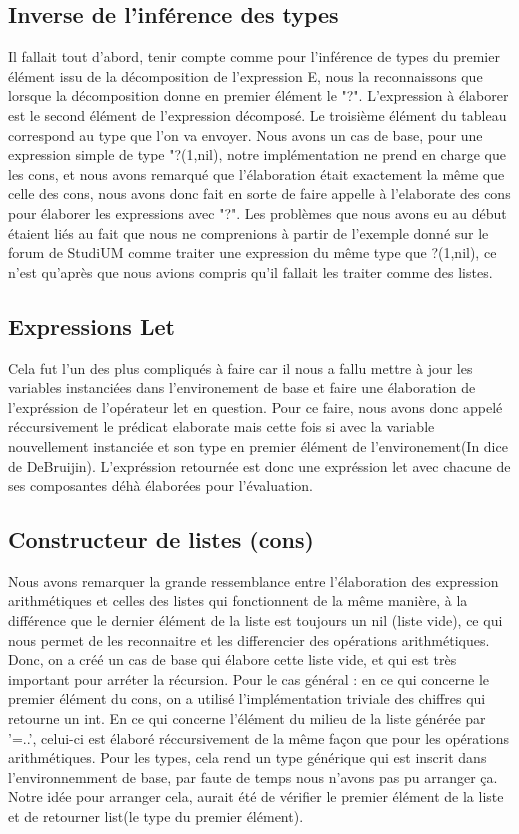 \documentclass{article}
\begin{document}
\subsection{Inverse de l'inférence des types}

Il fallait tout d'abord, tenir compte comme pour l'inférence de types du premier élément issu de la décomposition de l'expression E, nous la reconnaissons que lorsque la décomposition donne en premier élément le "?". 
L'expression à élaborer est le second élément de l'expression décomposé. Le troisième élément du tableau correspond au type que l'on va envoyer. Nous avons un cas de base, pour une expression simple de type "?(1,nil), notre implémentation ne prend en charge que les cons, et nous avons remarqué que l'élaboration était exactement la même que celle des cons, nous avons donc fait en sorte de faire appelle à l'elaborate des cons pour élaborer les expressions avec "?". Les problèmes que nous avons eu au début étaient liés au fait que nous ne comprenions à partir de l'exemple donné sur le forum de StudiUM comme traiter une expression du même type que ?(1,nil), ce n'est qu'après que nous avions compris qu'il fallait les traiter comme des listes. 
\subsection{Expressions Let}
Cela fut l'un des plus compliqués à faire car il nous a fallu mettre à jour les variables instanciées dans l'environement de base et faire une élaboration de l'expréssion de l'opérateur let en question. Pour ce faire, nous avons donc appelé réccursivement le prédicat elaborate mais cette fois si avec la variable nouvellement instanciée et son type en premier élément de l'environement(In dice de DeBruijin). L'expréssion retournée est donc une expréssion let avec chacune de ses composantes déhà élaborées pour l'évaluation.

\subsection{Constructeur de listes (cons)}
Nous avons remarquer la grande ressemblance entre l'élaboration des expression arithmétiques et celles
    des listes qui fonctionnent de la même manière, à la différence que le dernier élément de la liste est toujours un nil (liste vide), ce qui nous permet de les reconnaitre
    et les differencier des opérations arithmétiques. 
    Donc, on a créé un cas de base qui élabore cette liste vide, et qui est très important pour arréter la récursion. Pour le cas général :
    en ce qui concerne le premier élément du cons, on a utilisé l'implémentation triviale des chiffres qui retourne un int. 
    En ce qui concerne l'élément du milieu de la liste générée par '=..', celui-ci est élaboré réccursivement 
    de la même façon que pour les opérations arithmétiques.
    Pour les types, cela rend un type générique qui est inscrit dans l'environnemment de base, par faute de temps nous n'avons pas pu arranger ça.
    Notre idée pour arranger cela, aurait été de vérifier le premier élément de la liste et de retourner list(le type du premier élément). 
\end{document}
